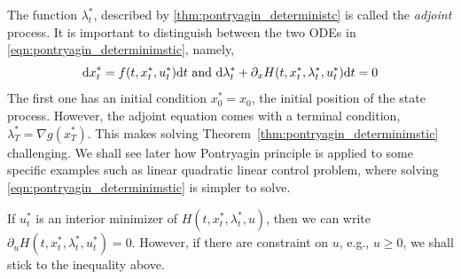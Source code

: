 \documentclass[11pt]{book}
\newcommand{\dd}{\text{\normalfont d}}
\newcommand{\dt}{\text{\normalfont d}t}
\newcommand{\dx}{\text{\normalfont d}x}
\begin{document}
The function $\lambda^*_t$, described by \ref{thm:pontryagin_deterministc} is called the \emph{adjoint} process. It is important to distinguish between the two ODEs in \eqref{eqn:pontryagin_determinimstic}, namely, 
\begin{equation}
    {\dx}^*_t = f(t,x^*_t,u^*_t) {{\dt}} \text{ and }{\dd}\lambda^*_t+ \partial_x H(t,x^*_t,\lambda^*_t,u^*_t){{\dt}}=0
\end{equation}
The first one has an initial condition $x^*_0=x_0$, the initial position of the state process. However, the adjoint equation comes with a terminal condition, $\lambda^*_T=\nabla g(x^*_T)$. This makes solving Theorem~\ref{thm:pontryagin_determinimstic} challenging. We shall see later how Pontryagin principle is applied to some specific examples such as linear quadratic linear control problem, where solving \eqref{eqn:pontryagin_determinimstic} is simpler to solve. 
\begin{rem}
If $u^*_t$ is an interior minimizer of $H(t,x^*_t,\lambda^*_t,u)$, then we can write $\partial_u H(t,x^*_t,\lambda^*_t,u^*_t)=0$. However, if there are constraint on $u$, e.g., $u\ge0$, we shall stick to the inequality above. 
\end{rem}
\end{document}
